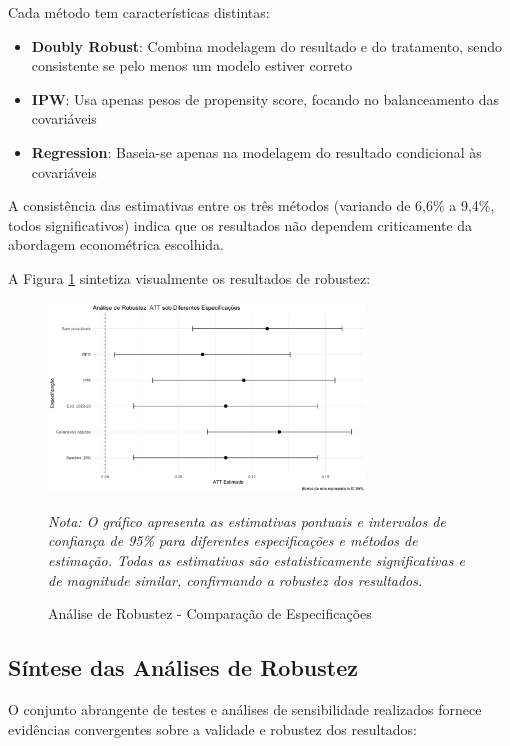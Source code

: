 \documentclass[
	12pt,				%
	oneside,			%
	a4paper,			%
	english,			%
	french,				%
	spanish,			%
	brazil				%
	]{abntex2}
\begin{document}
Cada método tem características distintas:
\begin{itemize}
\item \textbf{Doubly Robust}: Combina modelagem do resultado e do tratamento, sendo consistente se pelo menos um modelo estiver correto
\item \textbf{IPW}: Usa apenas pesos de propensity score, focando no balanceamento das covariáveis
\item \textbf{Regression}: Baseia-se apenas na modelagem do resultado condicional às covariáveis
\end{itemize}

A consistência das estimativas entre os três métodos (variando de 6,6\% a 9,4\%, todos significativos) indica que os resultados não dependem criticamente da abordagem econométrica escolhida.

A Figura \ref{fig:robustness} sintetiza visualmente os resultados de robustez:

\begin{figure}[H]
\centering
\caption{Análise de Robustez - Comparação de Especificações}
\label{fig:robustness}
\includegraphics[width=0.75\textwidth]{../../../data/outputs/robustness_plot.png}

\textit{Nota: O gráfico apresenta as estimativas pontuais e intervalos de confiança de 95\% para diferentes especificações e métodos de estimação. Todas as estimativas são estatisticamente significativas e de magnitude similar, confirmando a robustez dos resultados.}
\end{figure}

\subsection{Síntese das Análises de Robustez}

O conjunto abrangente de testes e análises de sensibilidade realizados fornece evidências convergentes sobre a validade e robustez dos resultados:
\end{document}
